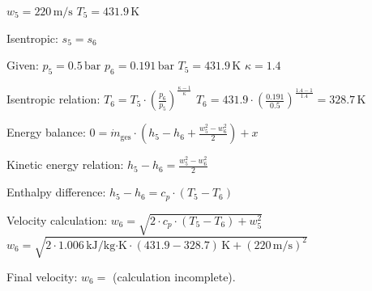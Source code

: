 \( w_5 = 220 \, \text{m/s} \)  
\( T_5 = 431.9 \, \text{K} \)  

Isentropic: \( s_5 = s_6 \)  

Given:  
\( p_5 = 0.5 \, \text{bar} \)  
\( p_6 = 0.191 \, \text{bar} \)  
\( T_5 = 431.9 \, \text{K} \)  
\( \kappa = 1.4 \)  

Isentropic relation:  
\( T_6 = T_5 \cdot \left( \frac{p_6}{p_5} \right)^{\frac{\kappa - 1}{\kappa}} \)  
\( T_6 = 431.9 \cdot \left( \frac{0.191}{0.5} \right)^{\frac{1.4 - 1}{1.4}} = 328.7 \, \text{K} \)  

Energy balance:  
\( 0 = \dot{m}_{\text{ges}} \cdot \left( h_5 - h_6 + \frac{w_5^2 - w_6^2}{2} \right) + x \)  

Kinetic energy relation:  
\( h_5 - h_6 = \frac{w_5^2 - w_6^2}{2} \)  

Enthalpy difference:  
\( h_5 - h_6 = c_p \cdot (T_5 - T_6) \)  

Velocity calculation:  
\( w_6 = \sqrt{2 \cdot c_p \cdot (T_5 - T_6) + w_5^2} \)  
\( w_6 = \sqrt{2 \cdot 1.006 \, \text{kJ/kg·K} \cdot (431.9 - 328.7) \, \text{K} + (220 \, \text{m/s})^2} \)  

Final velocity:  
\( w_6 = \) (calculation incomplete).